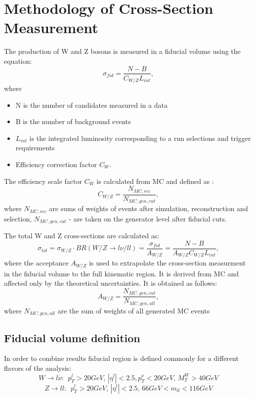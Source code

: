 \chapter{Methodology of Cross-Section Measurement}

The production of W and Z bosons is measured in a fiducial volume using the equation:
\begin{equation}
\sigma_{fid} = \frac{N-B}{C_{W/Z}L_{int}},
\end{equation}
where 
\begin{itemize}
\item N is the number of candidates measured in a data
\item B is the number of background events
\item $L_{int}$ is the integrated luminosity corresponding to a run selections and trigger requirements
\item Efficiency correction factor $C_{W}$. 
\end{itemize}

The efficiency scale factor $C_{W}$ is calculated from MC and defined as :
\begin{equation}
C_{W/Z}=\frac{N_{MC, rec}}{N_{MC,gen, cut}}, 
\end{equation}
where $N_{MC, rec}$ are sums of weights of events after simulation, reconstruction and selection, $N_{MC,gen, cut}$ - are taken on the generator level after fiducial cuts.

The total W and Z cross-sections are calculated as:
\begin{equation}
\sigma_{tot}=\sigma_{W/Z} \cdot BR(W/Z\to l\nu/ll)= \frac{\sigma_{fid}}{A_{W/Z}}= \frac{N-B}{A_{W/Z}C_{W/Z}L_{int}},
\end{equation}
where the acceptance $A_{W/Z}$ is used to extrapolate the cross-section measurment in the fiducial volume to the full kinematic region. It is derived from MC and affected only by the theoretical uncertainties. It is obtained as follows:
\begin{equation}
A_{W/Z}=\frac{N_{MC,gen, cut}}{N_{MC,gen,all}},
\end{equation}
where $N_{MC,gen,all}$ are the sum of weights of all generated MC events

\section{Fiducial volume definition}
In order to combine results  fiducial region is defined commonly for a different flavors of the analysis:
\begin{equation}
W \to l \nu: \, \, \, p_T^l > 20 GeV, \, |\eta^l| < 2.5, p_T^{\nu} <20 GeV, \, M_T^W > 40 GeV
\end{equation}
\begin{equation}
Z \to ll: \, \, \, p_T^l > 20 GeV, \, |\eta^l| < 2.5, \, 66 GeV <m_{ll} < 116 GeV
\end{equation}

